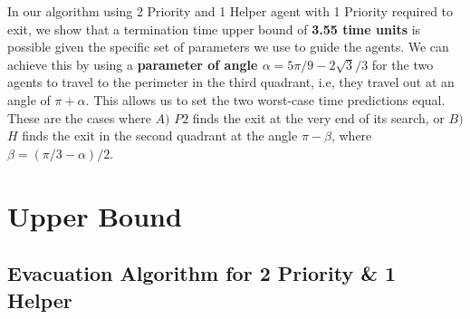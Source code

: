 \documentclass[11pt]{article}
\begin{document}
\begin{flushleft}
\hspace{\parindent} In our algorithm using 2 Priority and 1 Helper agent with 1 Priority required to exit, we show that a termination time
upper bound of \textbf{3.55 time units} is possible given the specific set of parameters we use
to guide the agents. We can achieve this by using a \textbf{parameter of angle $\alpha = 5 \pi / 9 - 2\sqrt3 /3$} for the two agents to travel to the perimeter in the third quadrant, i.e, they travel out at
an angle of \textbf{$\pi + \alpha$}. This allows us to set the two worst-case time predictions equal.
These are the cases where \textbf{$A)$} $P2$ finds the exit at the very end of its search,
or \textbf{$B)$} $H$ finds the exit in the second quadrant at the angle \textbf{$\pi - \beta$},
where \textbf{$\beta = ( \pi / 3 - \alpha) / 2$}.
\end{flushleft}




\section{Upper Bound}

\subsection {Evacuation Algorithm for 2 Priority \& 1 Helper}
\end{document}
